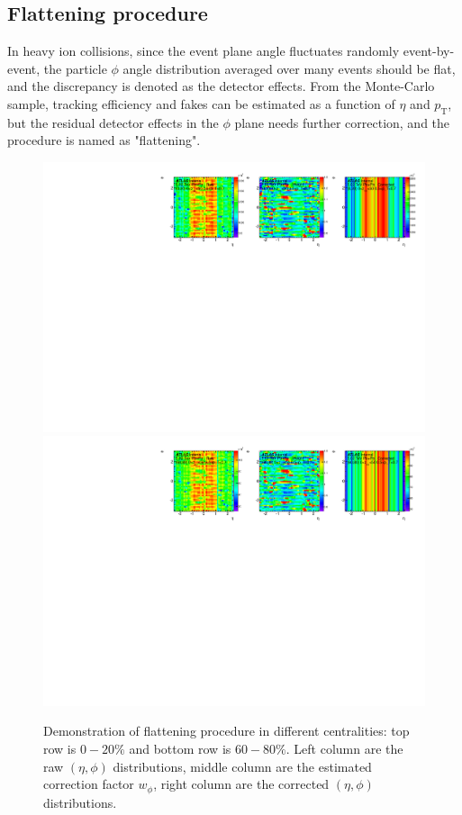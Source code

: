 \subsection{Flattening procedure}
In heavy ion collisions, since the event plane angle fluctuates randomly event-by-event, the particle $\phi$ angle distribution averaged over many events should be flat, and the discrepancy is denoted as the detector effects. From the Monte-Carlo sample, tracking efficiency and fakes can be estimated as a function of $\eta$ and $p_\text{T}$, but the residual detector effects in the $\phi$ plane needs further correction, and the procedure is named as "flattening".

\begin{figure}[H]
\centering
\includegraphics[width=.9\linewidth]{figs/sec_ana/cumuFlat_Cent0_Zvtx5_Chg0_Pt1.pdf}
\includegraphics[width=.9\linewidth]{figs/sec_ana/cumuFlat_Cent3_Zvtx5_Chg0_Pt1.pdf}
\caption{Demonstration of flattening procedure in different centralities: top row is $0-20\%$ and bottom row is $60-80\%$. Left column are the raw $(\eta,\phi)$ distributions, middle column are the estimated correction factor $w_{\phi}$, right column are the corrected $(\eta,\phi)$ distributions. }
\label{fig:cumuAna_FLAT_Cent}
\end{figure}
